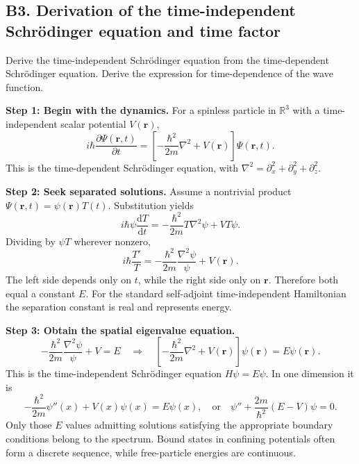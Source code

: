 \documentclass[11pt,a4paper]{article}
\newcommand{\dd}{\mathrm{d}}
\newcommand{\R}{\mathbb R}
\newcommand{\Sch}{Schr\"odinger}
\begin{document}
\subsection{B3. Derivation of the time-independent Schr\"odinger equation and time factor}
\begin{questionbox}Derive the time-independent Schr\"odinger equation from the time-dependent Schr\"odinger equation. Derive the expression for time-dependence of the wave function.\end{questionbox}
\textbf{Step 1: Begin with the dynamics.} For a spinless particle in $\R^3$ with a time-independent scalar potential $V(\mathbf r)$,
\begin{equation}\label{eq:TDSE}
\boxed{i\hbar\frac{\partial\Psi(\mathbf r,t)}{\partial t}
=\left[-\frac{\hbar^2}{2m}\nabla^2+V(\mathbf r)\right]\Psi(\mathbf r,t)}.
\end{equation}
This is the time-dependent \Sch{} equation, with $\nabla^2=\partial_x^2+\partial_y^2+\partial_z^2$.\par
\textbf{Step 2: Seek separated solutions.} Assume a nontrivial product $\Psi(\mathbf r,t)=\psi(\mathbf r)T(t)$. Substitution yields
\begin{equation}
i\hbar\psi\frac{\dd T}{\dd t}
=-\frac{\hbar^2}{2m}T\nabla^2\psi+VT\psi.
\end{equation}
Dividing by $\psi T$ wherever nonzero,
\begin{equation}\label{eq:separation}
i\hbar\frac{T'}T
=-\frac{\hbar^2}{2m}\frac{\nabla^2\psi}{\psi}+V(\mathbf r).
\end{equation}
The left side depends only on $t$, while the right side only on $\mathbf r$. Therefore both equal a constant $E$. For the standard self-adjoint time-independent Hamiltonian the separation constant is real and represents energy.\par
\textbf{Step 3: Obtain the spatial eigenvalue equation.}
\begin{equation}
-\frac{\hbar^2}{2m}\frac{\nabla^2\psi}{\psi}+V=E
\quad\Longrightarrow\quad
\boxed{\left[-\frac{\hbar^2}{2m}\nabla^2+V(\mathbf r)\right]\psi(\mathbf r)=E\psi(\mathbf r)}.
\end{equation}
This is the time-independent \Sch{} equation $H\psi=E\psi$. In one dimension it is
\begin{equation}
\boxed{-\frac{\hbar^2}{2m}\psi''(x)+V(x)\psi(x)=E\psi(x)},
\quad\text{or}\quad
\boxed{\psi''+\frac{2m}{\hbar^2}(E-V)\psi=0}.
\end{equation}
Only those $E$ values admitting solutions satisfying the appropriate boundary conditions belong to the spectrum. Bound states in confining potentials often form a discrete sequence, while free-particle energies are continuous.\par
\end{document}
